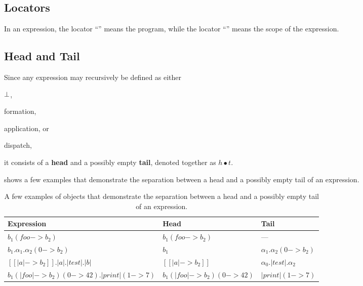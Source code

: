 \subsection{Locators}\label{sec:locators}

In an expression, the locator ``\stx{\Phi}'' means the program,
while the locator ``\stx{\xi}'' means the scope of the expression.

\subsection{Head and Tail}

\begin{definition}
Since any expression may recursively be defined as either \begin{inparaenum}[1)]
    \item \(\bot\),
    \item formation,
    \item application,
    or
    \item dispatch,
\end{inparaenum}
it consists of a \textbf{head} and a possibly empty \textbf{tail}, denoted together as \(h\bullet{}t\).
\end{definition}

\begin{example}
 shows a few examples that demonstrate the separation
between a head and a possibly empty tail of an expression.

\begin{table*}
\caption{A few examples of objects that demonstrate the separation between a head and a possibly empty tail of an expression.}
\label{tab:head-and-tail}
\begin{tabular}{lll}
\toprule
Expression & Head & Tail \\
\midrule
$b_1( foo -> b_2 )$
  & $b_1( foo -> b_2 )$
  & --- \\
$b_1.\alpha_1.\alpha_2( 0-> b_2 )$
  & $b_1$
  & $\alpha_1.\alpha_2( 0-> b_2 )$ \\
$[[ |a| -> b_2 ]].|a|.|test|.|b|$
  & $[[ |a| -> b_2 ]]$
  & $\alpha_0.|test|.\alpha_2$ \\
$b_1( |foo| -> b_2)( 0-> 42 ).|print|( 1-> 7 )$
  & $b_1( |foo| -> b_2)( 0-> 42 )$
  & $|print|( 1-> 7 )$ \\
\bottomrule
\end{tabular}
\end{table*}
\end{example}

